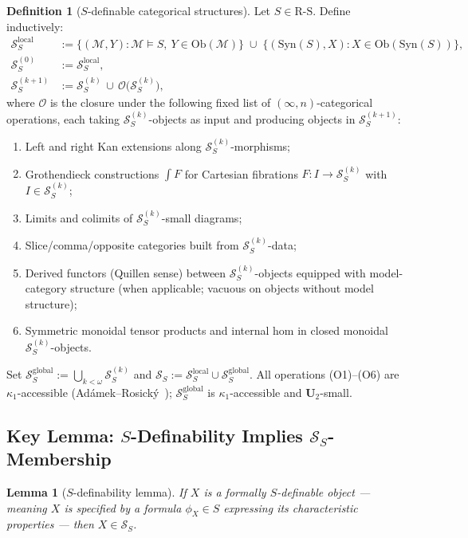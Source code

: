 \documentclass[11pt]{article}
\theoremstyle{plain}
\newtheorem{lemma}[theorem]{Lemma}
\theoremstyle{definition}
\newtheorem{definition}[theorem]{Definition}
\newcommand{\RS}{\mathrm{R\text{-}S}}
\newcommand{\cS}{\mathcal{S}}
\newcommand{\cM}{\mathcal{M}}
\newcommand{\Ob}{\mathrm{Ob}}
\newcommand{\Syn}{\mathrm{Syn}}
\begin{document}
\begin{definition}[$S$-definable categorical structures]\label{def:SS}
Let $S \in \RS$. Define inductively:
\begin{align*}
\cS_S^{\mathrm{local}} &:= \{(\cM, Y) : \cM \models S,\ Y \in \Ob(\cM)\} \;\cup\; \{(\Syn(S), X) : X \in \Ob(\Syn(S))\}, \\
\cS_S^{(0)} &:= \cS_S^{\mathrm{local}}, \\
\cS_S^{(k+1)} &:= \cS_S^{(k)} \,\cup\, \mathcal{O}\bigl(\cS_S^{(k)}\bigr),
\end{align*}
where $\mathcal{O}$ is the closure under the following fixed list of $(\infty, n)$-categorical operations, each taking $\cS_S^{(k)}$-objects as input and producing objects in $\cS_S^{(k+1)}$:
\begin{enumerate}[nosep,label=\textrm{(O\arabic*)}]
\item Left and right Kan extensions along $\cS_S^{(k)}$-morphisms;
\item Grothendieck constructions $\int F$ for Cartesian fibrations $F : I \to \cS_S^{(k)}$ with $I \in \cS_S^{(k)}$;
\item Limits and colimits of $\cS_S^{(k)}$-small diagrams;
\item Slice/comma/opposite categories built from $\cS_S^{(k)}$-data;
\item Derived functors (Quillen sense) between $\cS_S^{(k)}$-objects equipped with model-category structure (when applicable; vacuous on objects without model structure);
\item Symmetric monoidal tensor products and internal hom in closed monoidal $\cS_S^{(k)}$-objects.
\end{enumerate}
Set $\cS_S^{\mathrm{global}} := \bigcup_{k < \omega} \cS_S^{(k)}$ and $\cS_S := \cS_S^{\mathrm{local}} \cup \cS_S^{\mathrm{global}}$. All operations (O1)--(O6) are $\kappa_1$-accessible (Ad\'amek--Rosick\'y~\cite{AdamekRosicky1994}); $\cS_S^{\mathrm{global}}$ is $\kappa_1$-accessible and $\mathbf{U}_2$-small.
\end{definition}

\subsection{\texorpdfstring{Key Lemma: $S$-Definability Implies $\cS_S$-Membership}{Key Lemma: S-Definability Implies S\_S-Membership}}

\begin{lemma}[$S$-definability lemma]\label{lem:SS-membership}
If $X$ is a formally $S$-definable object --- meaning $X$ is specified by a formula $\phi_X \in S$ expressing its characteristic properties --- then $X \in \cS_S$.
\end{lemma}
\end{document}
